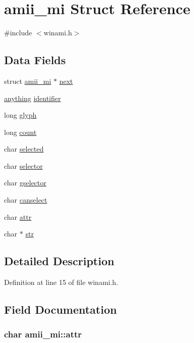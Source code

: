 \hypertarget{structamii__mi}{\section{amii\+\_\+mi Struct Reference}
\label{structamii__mi}
}


{\ttfamily \#include $<$winami.\+h$>$}

\subsection*{Data Fields}
\begin{DoxyCompactItemize}
\item 
struct \hyperlink{structamii__mi}{amii\+\_\+mi} $\ast$ \hyperlink{structamii__mi_a2046365b8a73513492596c98a5d30452}{next}
\item 
\hyperlink{wintype_8h_a49720928e6af182ee38aa332d0483b2a}{anything} \hyperlink{structamii__mi_ad856ed93a149eeb875438a1870a556fe}{identifier}
\item 
long \hyperlink{structamii__mi_a3e4c3c4ab75e4d6027c978bb75fffbce}{glyph}
\item 
long \hyperlink{structamii__mi_a15c24390709412f24da5e5207808712b}{count}
\item 
char \hyperlink{structamii__mi_a47a93b904054888bb7a94309a192f01a}{selected}
\item 
char \hyperlink{structamii__mi_a77084785d6d5815d0e006ad4ff6dd0b9}{selector}
\item 
char \hyperlink{structamii__mi_aa5480683a78e9e88d8569be6438c7ae5}{gselector}
\item 
char \hyperlink{structamii__mi_a68250523fd29eae87c3a438284fab1c0}{canselect}
\item 
char \hyperlink{structamii__mi_ac5dfee277f46f053ecd99b0b7f863bb6}{attr}
\item 
char $\ast$ \hyperlink{structamii__mi_a31791a6dba8c361ec8c8d5776bb82593}{str}
\end{DoxyCompactItemize}


\subsection{Detailed Description}


Definition at line 15 of file winami.\+h.



\subsection{Field Documentation}
\hypertarget{structamii__mi_ac5dfee277f46f053ecd99b0b7f863bb6}{
\subsubsection[{attr}]{\setlength{\rightskip}{0pt plus 5cm}char amii\+\_\+mi\+::attr}}\label{structamii__mi_ac5dfee277f46f053ecd99b0b7f863bb6}


